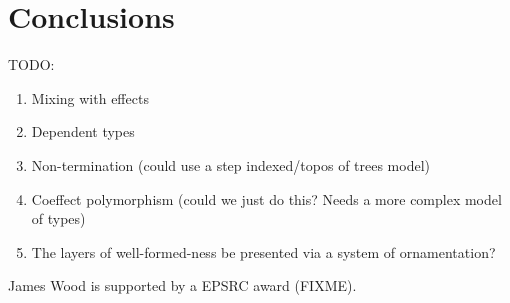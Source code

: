 \documentclass[sigplan,review]{acmart}\settopmatter{printfolios=true,printccs=false,printacmref=false}
\begin{document}
\section{Conclusions}

TODO:
\begin{enumerate}
\item Mixing with effects
\item Dependent types
\item Non-termination (could use a step indexed/topos of trees model)
\item Coeffect polymorphism (could we just do this? Needs a more
  complex model of types)
\item The layers of well-formed-ness be presented via a system of
  ornamentation?
\end{enumerate}

\begin{acks}                            %
  James Wood is supported by a EPSRC award (FIXME).
\end{acks}






\end{document}
